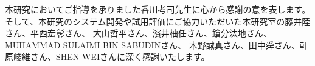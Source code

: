 \documentclass{csspaper}
\begin{document}
\acknowledgment  %
本研究においてご指導を承りました香川考司先生に心から感謝の意を表します。
そして、本研究のシステム開発や試用評価にご協力いただいた本研究室の藤井陸さん、平西宏彰さん、
大山哲平さん、濱井柚任さん、鎗分汰地さん、MUHAMMAD SULAIMI BIN SABUDINさん、
木野誠真さん、田中舜さん、軒原峻維さん、SHEN WEIさんに深く感謝いたします。

\end{document}
